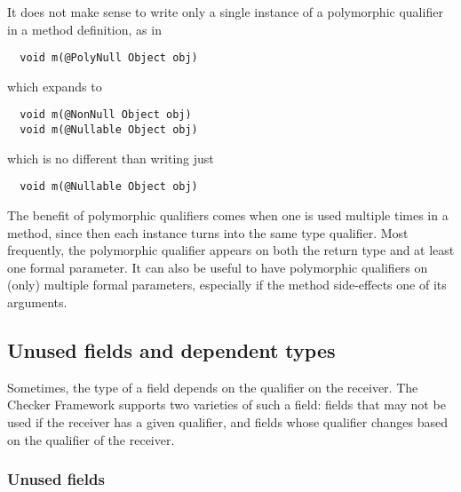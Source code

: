 It does not make sense to write only a single instance of a polymorphic
qualifier in a method definition, as in

\begin{Verbatim}
  void m(@PolyNull Object obj)
\end{Verbatim}

\noindent
which expands to

\begin{Verbatim}
  void m(@NonNull Object obj)
  void m(@Nullable Object obj)
\end{Verbatim}

\noindent
which is no different than writing just

\begin{Verbatim}
  void m(@Nullable Object obj)
\end{Verbatim}

\noindent
The benefit of polymorphic qualifiers comes when one is used multiple times
in a method, since then each instance turns into the same type qualifier.
Most frequently, the polymorphic qualifier appears on both the return type
and at least one formal parameter.  It can also be useful to have
polymorphic qualifiers on (only) multiple formal parameters, especially if
the method side-effects one of its arguments.






\subsection{Unused fields and dependent types}

Sometimes, the type of a field depends on the qualifier on the receiver.
The Checker Framework supports two varieties of such a field:  fields that
may not be used if the receiver has a given qualifier, and fields whose
qualifier changes based on the qualifier of the receiver.


\subsubsection{Unused fields\label{unused-fields}}

